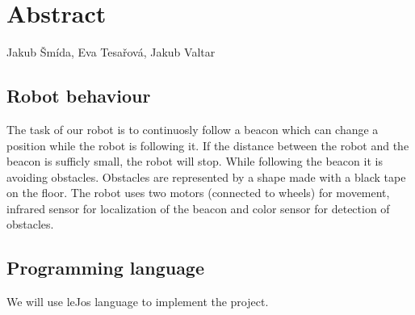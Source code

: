 \documentclass{article}
\begin{document}
\section*{\hfil Abstract \hfil}

\begin{center}
Jakub Šmída, Eva Tesařová, Jakub Valtar
\end{center}

\subsection*{Robot behaviour}
The task of our robot is to continuosly follow a beacon which can change a position while the robot is following it. If the distance between the robot and the beacon is sufficly small, the robot will stop. While following the beacon it is avoiding obstacles. Obstacles are represented by a shape made with a black tape on the floor. The robot uses two motors (connected to wheels) for movement, infrared sensor for localization of the beacon and color sensor for detection of obstacles.   

\subsection*{Programming language}
We will use leJos language to implement the project.
\end{document}
